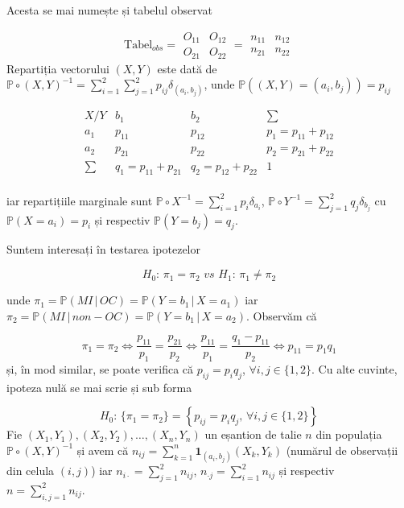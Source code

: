 \documentclass[]{article}
\begin{document}

Acesta se mai numește și tabelul observat

\[
  \text{Tabel}_{obs} = \begin{array}{c|c}
      O_{11} & O_{12}\\
      \hline
      O_{21} & O_{22}
  \end{array} = \begin{array}{c|c}
      n_{11} & n_{12}\\
      \hline
      n_{21} & n_{22}
  \end{array}
\] Repartiția vectorului \((X,Y)\) este dată de
\(\mathbb{P}\circ (X,Y)^{-1} = \sum_{i = 1}^{2}\sum_{j = 1}^{2}p_{ij}\delta_{(a_i,b_j)}\),
unde \(\mathbb{P}((X,Y) = (a_i, b_j)) = p_{ij}\)

\[
  \begin{array}{c|c|c|c}
    X/Y & b_1 & b_2 & \sum\\
    \hline
    a_1 & p_{11} & p_{12} & p_1 = p_{11} + p_{12}\\
    \hline
    a_2 & p_{21} & p_{22} & p_2 = p_{21} + p_{22}\\
    \hline
    \sum & q_1 = p_{11} + p_{21} & q_2 = p_{12} + p_{22} & 1\\
  \end{array}
\]

iar repartițiile marginale sunt
\(\mathbb{P}\circ X^{-1} = \sum_{i = 1}^{2}p_{i}\delta_{a_i}\),
\(\mathbb{P}\circ Y^{-1} = \sum_{j = 1}^{2}q_{j}\delta_{b_j}\) cu
\(\mathbb{P}(X = a_i) = p_i\) și respectiv
\(\mathbb{P}(Y = b_j) = q_j\).

Suntem interesați în testarea ipotezelor

\[
H_0:\, \pi_1 = \pi_2\,\, vs \,\, H_1:\,\pi_1 \neq \pi_2
\]

unde \(\pi_1=\mathbb{P}(MI\,|\,OC) = \mathbb{P}(Y = b_1\,|\,X = a_1)\)
iar
\(\pi_2=\mathbb{P}(MI\,|\,non-OC) = \mathbb{P}(Y = b_1\,|\,X = a_2)\).
Observăm că

\[
  \pi_1 = \pi_2 \iff \frac{p_{11}}{p_1} = \frac{p_{21}}{p_2} \iff \frac{p_{11}}{p_1} = \frac{q_1 - p_{11}}{p_2} \iff p_{11} = p_1q_1
\] și, în mod similar, se poate verifica că \(p_{ij} = p_iq_j\),
\(\forall i,j\in\{1,2\}\). Cu alte cuvinte, ipoteza nulă se mai scrie și
sub forma

\[
  H_0:\, \{\pi_1 = \pi_2\} = \left\{p_{ij} = p_iq_j,\,\forall i,j\in\{1,2\}\right\}
\] Fie \((X_1, Y_1), (X_2, Y_2),\ldots,(X_n, Y_n)\) un eșantion de talie
\(n\) din populația \(\mathbb{P}\circ (X,Y)^{-1}\) și avem că
\(n_{ij} = \sum_{k = 1}^n\mathbf{1}_{(a_i, b_j)}(X_k, Y_k)\) (numărul de
observații din celula \((i,j)\)) iar
\(n_{i\cdot} = \sum_{j = 1}^{2}n_{ij}\),
\(n_{\cdot j} = \sum_{i = 1}^{2}n_{ij}\) și respectiv
\(n = \sum_{i,j = 1}^{2}n_{ij}\).
\end{document}
